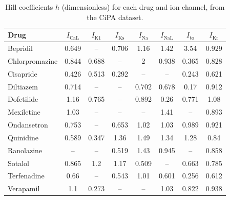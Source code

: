 \begin{table}[t]
\centering
\caption{Hill coefficients $h$ (dimensionless) for each drug and ion channel, from the CiPA dataset.}
\label{tab:supp-hill}
\footnotesize
\begin{tabular}{l S S S S S S S}
\toprule
\textbf{Drug} & {$I_{\mathrm{CaL}}$} & {$I_{\mathrm{K1}}$} & {$I_{\mathrm{Ks}}$} & {$I_{\mathrm{Na}}$} & {$I_{\mathrm{NaL}}$} & {$I_{\mathrm{to}}$} & {$I_{\mathrm{Kr}}$} \\
\midrule
Bepridil & 0.649 & {--} & 0.706 & 1.16 & 1.42 & 3.54 & 0.929 \\
Chlorpromazine & 0.844 & 0.688 & {--} & 2 & 0.938 & 0.365 & 0.828 \\
Cisapride & 0.426 & 0.513 & 0.292 & {--} & {--} & 0.243 & 0.621 \\
Diltiazem & 0.714 & {--} & {--} & 0.702 & 0.678 & 0.17 & 0.912 \\
Dofetilide & 1.16 & 0.765 & {--} & 0.892 & 0.26 & 0.771 & 1.08 \\
Mexiletine & 1.03 & {--} & {--} & {--} & 1.41 & {--} & 0.893 \\
Ondansetron & 0.753 & {--} & 0.653 & 1.02 & 1.03 & 0.989 & 0.921 \\
Quinidine & 0.589 & 0.347 & 1.36 & 1.49 & 1.34 & 1.28 & 0.84 \\
Ranolazine & {--} & {--} & 0.519 & 1.43 & 0.945 & {--} & 0.858 \\
Sotalol & 0.865 & 1.2 & 1.17 & 0.509 & {--} & 0.663 & 0.785 \\
Terfenadine & 0.66 & {--} & 0.543 & 1.01 & 0.601 & 0.256 & 0.612 \\
Verapamil & 1.1 & 0.273 & {--} & {--} & 1.03 & 0.822 & 0.938 \\
\bottomrule
\end{tabular}
\end{table}
